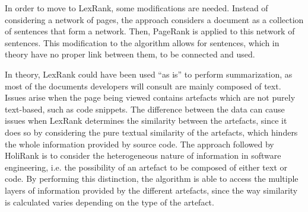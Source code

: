 In order to move to LexRank, some modifications are needed. Instead of considering a network of pages, the approach considers a document as a collection of sentences that form a network. Then, PageRank is applied to this network of sentences. This modification to the algorithm allows for sentences, which in theory have no proper link between them, to be connected and used. 

In theory, LexRank could have been used ``as is'' to perform summarization, as most of the documents developers will consult are mainly composed of text. Issues arise when the page being viewed contains artefacts which are not purely text-based, such as code snippets. The difference between the data can cause issues when LexRank determines the similarity between the artefacts, since it does so by considering the pure textual similarity of the artefacts, which hinders the whole information provided by source code. The approach followed by HoliRank is to consider the heterogeneous nature of information in software engineering, i.e. the possibility of an artefact to be composed of either text or code. By performing this distinction, the algorithm is able to access the multiple layers of information provided by the different artefacts, since the way similarity is calculated varies depending on the type of the artefact. 